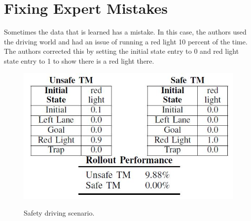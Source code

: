 \documentclass[letterpaper, 10 pt, conference]{ieeeconf}  %
\begin{document}
\section{Fixing Expert Mistakes}
Sometimes the data that is learned has a mistake. In this case, the authors used the driving world and had an issue of running a red light 10 percent of the time. The authors corrected this by setting the initial state entry to 0 and red light state entry to 1 to show there is a red light there. 
\begin{figure}[h]
 \centering
 \includegraphics[scale=.5]{DrivingSafe.JPG}\\
 \caption{Safety driving scenario.}
\end{figure}
\end{document}
